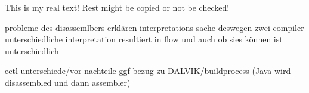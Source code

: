 This is my real text! Rest might be copied or not be checked!


probleme des disassemlbers erklären\newline
interpretations sache\newline
deswegen zwei compiler\newline
unterschiedliche interpretation resultiert in flow und auch ob sies können ist unterschiedlich\newline

ectl unterschiede/vor-nachteile\newline
ggf bezug zu DALVIK/buildprocess (Java wird disassembled und dann assembler)\newline
